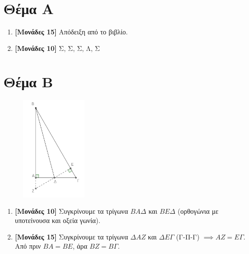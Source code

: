 \documentclass[12pt]{article}
\begin{document}
\section*{Θέμα Α}
  \noindent
  \begin{enumerate}
    \item \textbf{[Μονάδες 15]} Απόδειξη από το βιβλίο.
    \item \textbf{[Μονάδες 10]} Σ, Σ, Σ, Λ, Σ
  \end{enumerate}

\section*{Θέμα Β}
  \noindent
  \begin{figure}
    \centering
    \vspace{-140pt}
    \includegraphics[width=0.3\textwidth]{2017AGeo2}
  \end{figure}
  \begin{enumerate}
    \item \textbf{[Μονάδες 10]} Συγκρίνουμε τα τρίγωνα $ΒΑΔ$ και $ΒΕΔ$ (ορθογώνια με υποτείνουσα και οξεία γωνία).
    \item \textbf{[Μονάδες 15]} Συγκρίνουμε τα τρίγωνα $ΔΑΖ$ και $ΔΕΓ$ (Γ-Π-Γ) $\implies ΑΖ=ΕΓ$. Από πριν $ΒΑ=ΒΕ$, άρα $ΒΖ=ΒΓ$.
  \end{enumerate}
\end{document}
